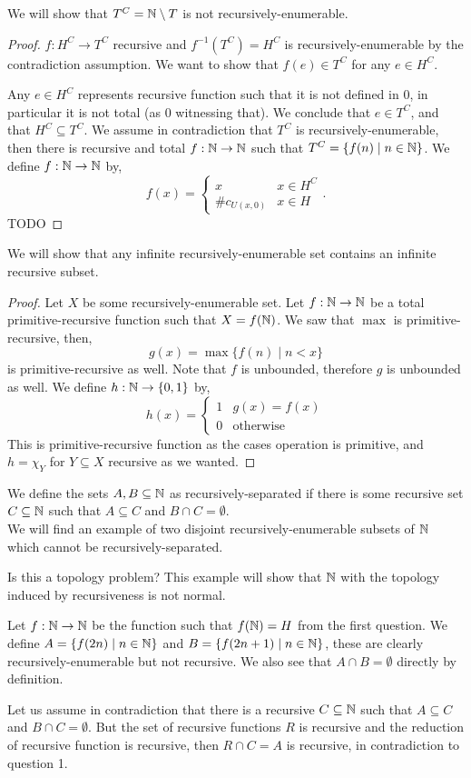 \subquestion{}
We will show that $T^C = \mathbb{N} \setminus T$ is not recursively-enumerable.
\begin{proof}
	$f : H^C \to T^C$ recursive and $f^{-1}(T^C) = H^C$ is recursively-enumerable by the contradiction assumption.
	We want to show that $f(e) \in T^C$ for any $e \in H^C$.

	Any $e \in H^C$ represents recursive function such that it is not defined in $0$, in particular it is not total (as $0$ witnessing that).
	We conclude that $e \in T^C$, and that $H^C \subseteq T^C$.
	We assume in contradiction that $T^C$ is recursively-enumerable, then there is recursive and total $f : \mathbb{N} \to \mathbb{N}$ such that $T^C = \{ f(n) \mid n \in \mathbb{N} \}$.
	We define $f : \mathbb{N} \to \mathbb{N}$ by,
	\[
		f(x)
		= \begin{cases}
			x & x \in H^C \\
			\# c_{U(x, 0)} & x \in H
		\end{cases}
	.\]
	TODO
\end{proof}

\question{}
We will show that any infinite recursively-enumerable set contains an infinite recursive subset.
\begin{proof}
	Let $X$ be some recursively-enumerable set.
	Let $f : \mathbb{N} \to \mathbb{N}$ be a total primitive-recursive function such that $X = f(\mathbb{N})$.
	We saw that $\max$ is primitive-recursive, then,
	\[
		g(x) = \max \{ f(n) \mid n < x \}
	\]
	is primitive-recursive as well.
	Note that $f$ is unbounded, therefore $g$ is unbounded as well.
	We define $h : \mathbb{N} \to \{ 0, 1\}$ by,
	\[
		h(x)
		= \begin{cases}
			1 & g(x) = f(x) \\
			0 & \text{otherwise}
		\end{cases}
	\]
	This is primitive-recursive function as the cases operation is primitive, and $h = \chi_Y$ for $Y \subseteq X$ recursive as we wanted.
\end{proof}

\question{}
We define the sets $A, B \subseteq \mathbb{N}$ as recursively-separated if there is some recursive set $C \subseteq \mathbb{N}$ such that $A \subseteq C$ and $B \cap C = \emptyset$. \\
We will find an example of two disjoint recursively-enumerable subsets of $\mathbb{N}$ which cannot be recursively-separated.
\begin{solution}
	Is this a topology problem?
	This example will show that $\mathbb{N}$ with the topology induced by recursiveness is not normal.

	Let $f : \mathbb{N} \to \mathbb{N}$ be the function such that $f(\mathbb{N}) = H$ from the first question.
	We define $A = \{ f(2n) \mid n \in \mathbb{N} \}$ and $B = \{ f(2n + 1) \mid n \in \mathbb{N} \}$, these are clearly recursively-enumerable but not recursive.
	We also see that $A \cap B = \emptyset$ directly by definition.

	Let us assume in contradiction that there is a recursive $C \subseteq \mathbb{N}$ such that $A \subseteq C$ and $B \cap C = \emptyset$.
	But the set of recursive functions $R$ is recursive and the reduction of recursive function is recursive, then $R \cap C = A$ is recursive, in contradiction to question 1.
\end{solution}


